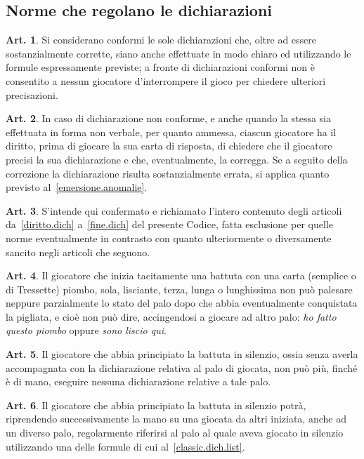 \documentclass[italian,a4paper]{book}
\theoremstyle{definition}
\newtheorem{art}{Art.}
\begin{document}
\subsection{Norme che regolano le dichiarazioni}
\begin{art}
Si considerano conformi le sole dichiarazioni che, oltre ad essere sostanzialmente corrette, siano anche effettuate in modo chiaro ed utilizzando le formule espressamente previste; a fronte di dichiarazioni conformi non è consentito a nessun giocatore d'interrompere il gioco per chiedere ulteriori precisazioni.
\end{art}
\begin{art}
In caso di dichiarazione non conforme, e anche quando la stessa sia
effettuata in forma non verbale, per quanto ammessa, ciascun giocatore ha il
diritto, prima di giocare la sua carta di risposta, di chiedere che il
giocatore precisi la sua dichiarazione e che, eventualmente, la corregga. Se
a seguito della correzione la dichiarazione risulta sostanzialmente errata,
si applica quanto previsto al~\ref{emersione.anomalie}.
\end{art}
\begin{art}\label{classic.dich}
S'intende qui confermato e richiamato l'intero contenuto degli articoli
da~\ref{diritto.dich} a~\ref{fine.dich} del presente Codice, fatta esclusione per quelle norme eventualmente in contrasto con quanto ulteriormente o diversamente sancito negli articoli che seguono.
\end{art}
\begin{art}
Il giocatore che inizia tacitamente una battuta con una carta (semplice o di
Tressette) piombo, sola, lisciante, terza, lunga o lunghissima non può
palesare neppure parzialmente lo stato del palo dopo che abbia eventualmente
conquistata la pigliata, e cioè non può dire, accingendosi a giocare ad
altro palo: \emph{ho fatto questo piombo} oppure \emph{sono liscio qui}.
\end{art}
\begin{art}
    Il giocatore che abbia principiato la battuta in silenzio, ossia senza averla accompagnata con la dichiarazione relativa al palo di giocata, non può più, finché è di mano, eseguire nessuna dichiarazione relative a tale palo.
\end{art}
\begin{art}
Il giocatore che abbia principiato la battuta in silenzio potrà, riprendendo successivamente la mano su una giocata da altri
iniziata, anche ad un diverso palo, regolarmente riferirsi al palo al quale
aveva giocato in silenzio utilizzando una delle formule di cui
al~\ref{classic.dich.list}.
\end{art}
\end{document}
